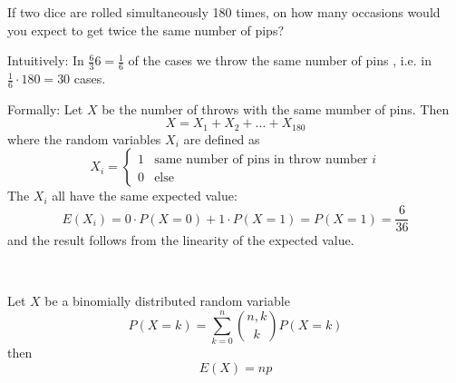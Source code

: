 \documentclass[twoside,11pt,a4paper]{article}
\newif\ifEN \ENtrue	                %
\def\tr|#1|#2|{\ifEN #2\else #1\fi}     %
\newenvironment{ttile}[1]{\begin{tcolorbox}[colback=tile,sharp corners,title=#1]}{\end{tcolorbox}}
\theoremstyle{definition}
\newcounter{exc}
\def\answerline#1{%
   \ifhmode\\[1ex]\fcolorbox{solbox}{solbox}{\hbox to \linewidth{\vbox to #1\baselineskip{}}}%
   \else\fcolorbox{solbox}{solbox}{\hbox to \linewidth{\vbox to #1\baselineskip{}}}%
   \fi
 }
\begin{document}
\begin{xxwrap}
\begin{exc}
\tr|Wenn zwei Würfel gleichzeitig 180  mal gewürfelt werden, wie oft erwarten Sie identische Augenzahlen?
|If two dice are rolled simultaneously 180 times, 
on how many occasions would you expect to get twice the same number of pips?|
\end{exc}
\begin{Answer}
  \tr|Intuitiv: In $\frac6{36}=\frac16$ aller Fälle werfen wir identische Augenzahlen, insgesamt in $\frac16\cdot180=30$ Fällen.
     |Intuitively: In $\frac6{36}=\frac16$ of the cases we throw the same number of pins , i.e. in $\frac16\cdot180=30$ cases.|
\par
\tr|Formal: Sei $X$ die Anzahl Würfe mit identischen Augenzahlen nach 180 Würfen. Dann ist 
   |Formally: Let $X$ be the number of throws with the same mumber of pins. Then | 
\[
X=X_1+X_2+\ldots+X_{180}
\]
\tr|wobei die Zufallsvariabeln $X_i$ definiert sind durch|where the random variables $X_i$ are defined as|
\[
X_i=\left\{
\begin{array}{ll}
 1 & \text{\tr|gleiche Augenzahl in Wurf $i$|same number of pins in throw number $i$|}\\
 0 & \text{\tr|sonst|else|}
\end{array}\right.
\] 
\tr|Die $X_i$ haben alle den gleichen Erwartungswert:|The $X_i$ all have the same expected value:|
\[
E(X_i)=0\cdot P(X=0)+1\cdot P(X=1)=P(X=1)=\frac6{36}
\]
\tr|und das Resultat folgt aus der Linearität des Erwartungswertes. | and the result follows from the linearity of the expected value. |
\end{Answer}
\answerline{12}
\end{xxwrap}
\vfill
\begin{ttile}{\tr|Erwartungswert einer binomial verteilten Zufallsvariabeln |Expectation of a binomially distributed random variable|}
\tr|Sei $X$ eine binomial verteilte Zufallsvariable |Let $X$ be a binomially distributed random variable|
   \[
     P(X=k)=\sum_{k=0}^n\binom{n,k}kP(X=k)
   \]
\tr|dann gilt für ihren Erwartungswert |then|
\[
E(X)=np
\]
\end{ttile}
\end{document}
